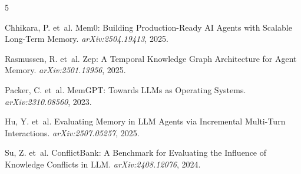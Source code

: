 \documentclass[11pt]{article}
\begin{document}
\begin{thebibliography}{5}

Chhikara, P. et~al.
\newblock Mem0: Building Production-Ready AI Agents with Scalable Long-Term Memory.
\newblock \emph{arXiv:2504.19413}, 2025.

Rasmussen, R. et~al.
\newblock Zep: A Temporal Knowledge Graph Architecture for Agent Memory.
\newblock \emph{arXiv:2501.13956}, 2025.

Packer, C. et~al.
\newblock MemGPT: Towards LLMs as Operating Systems.
\newblock \emph{arXiv:2310.08560}, 2023.

Hu, Y. et~al.
\newblock Evaluating Memory in LLM Agents via Incremental Multi-Turn Interactions.
\newblock \emph{arXiv:2507.05257}, 2025.

Su, Z. et~al.
\newblock ConflictBank: A Benchmark for Evaluating the Influence of Knowledge Conflicts in LLM.
\newblock \emph{arXiv:2408.12076}, 2024.

\end{thebibliography}
\end{document}
